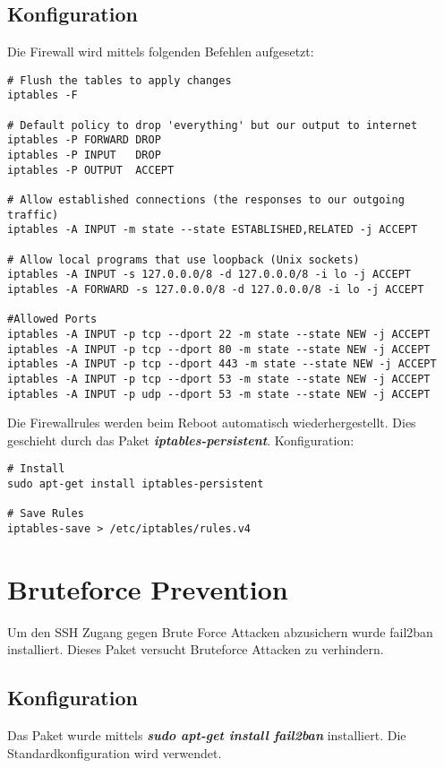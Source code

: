 \documentclass[12pt,a4paper,oneside,ngerman]{scrartcl}
\begin{document}
\subsection{Konfiguration}
Die Firewall wird mittels folgenden Befehlen aufgesetzt:
\begin{lstlisting}
# Flush the tables to apply changes
iptables -F

# Default policy to drop 'everything' but our output to internet
iptables -P FORWARD DROP
iptables -P INPUT   DROP
iptables -P OUTPUT  ACCEPT

# Allow established connections (the responses to our outgoing traffic)
iptables -A INPUT -m state --state ESTABLISHED,RELATED -j ACCEPT

# Allow local programs that use loopback (Unix sockets)
iptables -A INPUT -s 127.0.0.0/8 -d 127.0.0.0/8 -i lo -j ACCEPT
iptables -A FORWARD -s 127.0.0.0/8 -d 127.0.0.0/8 -i lo -j ACCEPT

#Allowed Ports
iptables -A INPUT -p tcp --dport 22 -m state --state NEW -j ACCEPT
iptables -A INPUT -p tcp --dport 80 -m state --state NEW -j ACCEPT
iptables -A INPUT -p tcp --dport 443 -m state --state NEW -j ACCEPT
iptables -A INPUT -p tcp --dport 53 -m state --state NEW -j ACCEPT
iptables -A INPUT -p udp --dport 53 -m state --state NEW -j ACCEPT
\end{lstlisting}
\newpage


Die Firewallrules werden beim Reboot automatisch wiederhergestellt. Dies geschieht durch das Paket \textbf{\textit{iptables-persistent}}. Konfiguration\cite{HOWTO:2}:

\begin{lstlisting}
# Install
sudo apt-get install iptables-persistent

# Save Rules
iptables-save > /etc/iptables/rules.v4
\end{lstlisting}

\section{Bruteforce Prevention}
Um den SSH Zugang gegen Brute Force Attacken abzusichern wurde fail2ban installiert. Dieses Paket versucht Bruteforce Attacken zu verhindern. \cite{HOWTO:1} \\

\subsection{Konfiguration}
Das Paket wurde mittels \textbf{\textit{sudo apt-get install fail2ban}} installiert. Die Standardkonfiguration wird verwendet.
\end{document}
